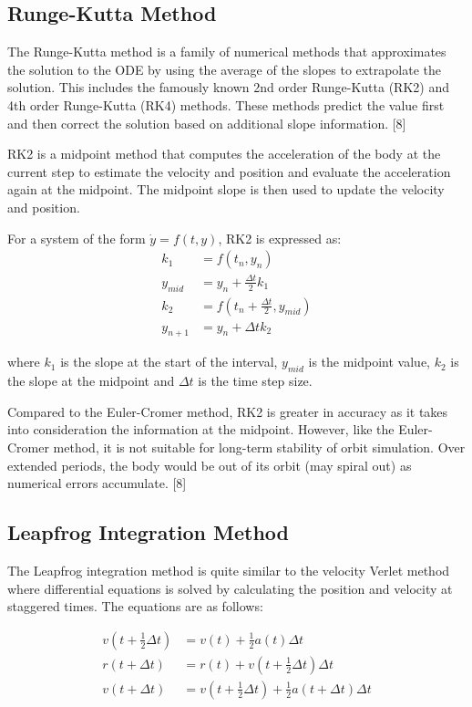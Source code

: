 \documentclass[11 pt, a4paper, twocolumn]{article}
\begin{document}
\subsection{Runge-Kutta Method}
The Runge-Kutta method is a family of numerical methods that approximates the solution to the ODE by
using the average of the slopes to extrapolate the solution. This includes the famously known 2nd order 
Runge-Kutta (RK2) and 4th order Runge-Kutta (RK4) methods. These methods predict the value first and 
then correct the solution based on additional slope information. [8] 

RK2 is a midpoint method that computes the acceleration of the body at the current step to estimate the 
velocity and position and evaluate the acceleration again at the midpoint. The midpoint slope is then used
to update the velocity and position.

For a system of the form $\dot{y} = f(t,y)$, RK2 is expressed as:
\vspace{-0.1em}
\begin{align}
k_1 &= f(t_n, y_n) \tag{Eq. 9a} \\
y_{mid} &= y_n + \frac{\Delta t}{2}k_1 \tag{Eq. 9b} \\
k_2 &= f(t_n + \frac{\Delta t}{2}, y_{mid}) \tag{Eq. 9c} \\
y_{n+1} &= y_n + \Delta t k_2 \tag{Eq. 9d}
\end{align}

where $k_1$ is the slope at the start of the interval, $y_{mid}$ is the midpoint value, $k_2$ is the 
slope at the midpoint and $\Delta t$ is the time step size.

Compared to the Euler-Cromer method, RK2 is greater in accuracy as it takes into consideration the 
information at the midpoint. However, like the Euler-Cromer method, it is not suitable for long-term
stability of orbit simulation. Over extended periods, the body would be out of its orbit (may spiral out)
as numerical errors accumulate. [8]

\subsection{Leapfrog Integration Method}
The Leapfrog integration method is quite similar to the velocity Verlet method where differential
equations is solved by calculating the position and velocity at staggered times. The equations are 
as follows:

\begin{align}
v(t +\frac{1}{2}\Delta t) &= v(t) + \frac{1}{2}a(t)\Delta t \tag{Eq. 10a} \\
r(t + \Delta t) &= r(t) + v(t +\frac{1}{2}\Delta t)\Delta t \tag{Eq. 10b} \\
v(t +\Delta t) &= v(t +\frac{1}{2}\Delta t) + \frac{1}{2}a(t + \Delta t)\Delta t \tag{Eq. 10c}
\end{align}
\end{document}
